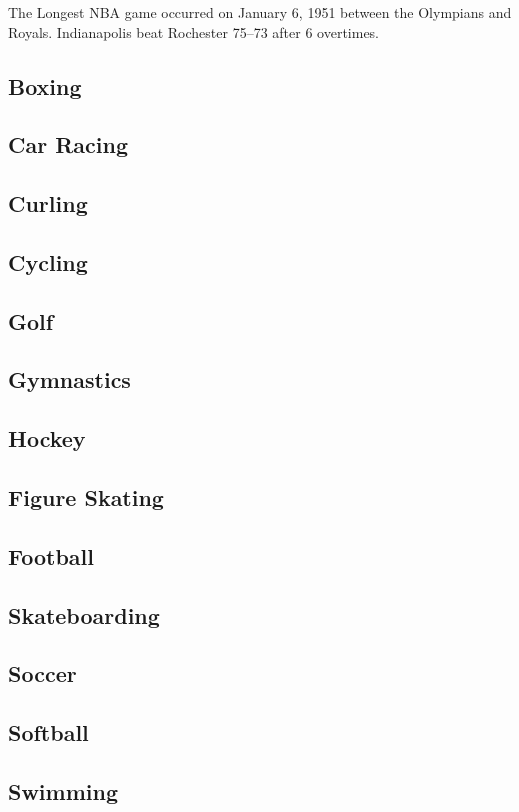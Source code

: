 \documentclass[12pt]{book}
\begin{document}
			The Longest NBA game occurred on January 6, 1951 between the Olympians and Royals. Indianapolis beat Rochester 75–73 after 6 overtimes.
			
			
		
		\newpage		
		\subsection{Boxing}
		\subsection{Car Racing}
		\subsection{Curling}
		\subsection{Cycling}
		\subsection{Golf}
		\subsection{Gymnastics}
		\subsection{Hockey}
		\subsection{Figure Skating}
		\subsection{Football}
		\subsection{Skateboarding}		
		\subsection{Soccer}
		\subsection{Softball}
		\subsection{Swimming}
\end{document}
